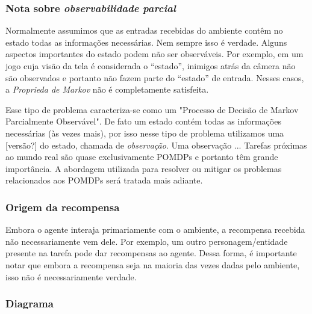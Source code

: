 \documentclass{article}
\begin{document}
            \subsubsection{Nota sobre \emph{observabilidade parcial}}

                Normalmente assumimos que as entradas recebidas do ambiente contêm no estado todas as informações necessárias. Nem sempre isso é verdade. Alguns aspectos importantes do estado podem não ser observáveis. Por exemplo, em um jogo cuja visão da tela é considerada o ``estado'', inimigos atrás da câmera não são observados e portanto não fazem parte do ``estado'' de entrada. Nesses casos, a \emph{Proprieda de Markov} não é completamente satisfeita. 
                
                Esse tipo de problema caracteriza-se como um "Processo de Decisão de Markov Parcialmente Observável". De fato um estado contém todas as informações necessárias (às vezes mais), por isso nesse tipo de problema utilizamos uma [versão?] do estado, chamada de \emph{observação}. Uma observação ... Tarefas próximas ao mundo real são quase exclusivamente POMDPs e portanto têm grande importância. A abordagem utilizada para resolver ou mitigar os problemas relacionados aos POMDPs será tratada mais adiante.

            \subsubsection{Origem da recompensa}
            
                Embora o agente interaja primariamente com o ambiente, a recompensa recebida não necessariamente vem dele. Por exemplo, um outro personagem/entidade presente na tarefa pode dar recompensas ao agente. Dessa forma, é importante notar que embora a recompensa seja na maioria das vezes dadas pelo ambiente, isso não é necessariamente verdade.

            \subsubsection{Diagrama}
\end{document}
